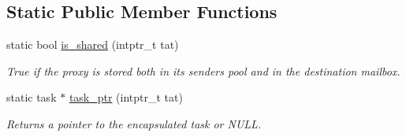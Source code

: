 \subsection*{Static Public Member Functions}
\begin{DoxyCompactItemize}
\item 
\hypertarget{structtbb_1_1internal_1_1task__proxy_a364254f54e3817ee490eab693b9ee916}{}static bool \hyperlink{structtbb_1_1internal_1_1task__proxy_a364254f54e3817ee490eab693b9ee916}{is\+\_\+shared} (intptr\+\_\+t tat)\label{structtbb_1_1internal_1_1task__proxy_a364254f54e3817ee490eab693b9ee916}

\begin{DoxyCompactList}\small\item\em True if the proxy is stored both in its sender\textquotesingle{}s pool and in the destination mailbox. \end{DoxyCompactList}\item 
\hypertarget{structtbb_1_1internal_1_1task__proxy_a692bc943f855fd765269bcb65695b283}{}static task $\ast$ \hyperlink{structtbb_1_1internal_1_1task__proxy_a692bc943f855fd765269bcb65695b283}{task\+\_\+ptr} (intptr\+\_\+t tat)\label{structtbb_1_1internal_1_1task__proxy_a692bc943f855fd765269bcb65695b283}

\begin{DoxyCompactList}\small\item\em Returns a pointer to the encapsulated task or N\+U\+L\+L. \end{DoxyCompactList}\end{DoxyCompactItemize}
